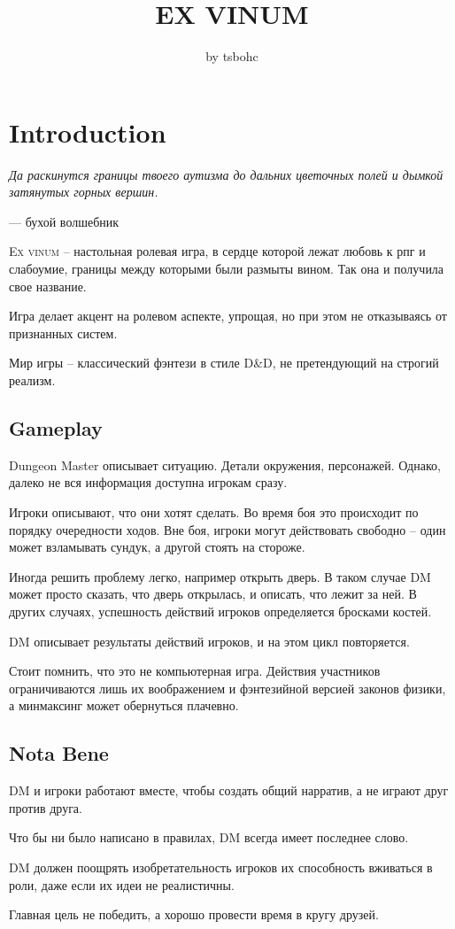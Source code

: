 \documentclass[a5paper,11pt]{book}
\title{\textbf{EX VINUM}}
\author{by tsbohc}
\date{}
\begin{document}
\maketitle
\thispagestyle{empty}
\enlargethispage{\baselineskip}
\tableofcontents
\pagebreak

\chapter{Introduction}
\begin{multicols}{2}
\epigraph{\emph{Да раскинутся границы твоего аутизма до дальних цветочных полей и дымкой затянутых горных вершин.}}{--- бухой волшебник}

\lettrine{E}{x vinum} -- настольная ролевая игра, в сердце которой лежат любовь к рпг и слабоумие, границы между которыми были размыты вином. Так она и получила свое название.

Игра делает акцент на ролевом аспекте, упрощая, но при этом не отказываясь от признанных систем.

Мир игры -- классический фэнтези в стиле D\&D, не претендующий на строгий реализм.

\section{Gameplay}
Dungeon Master описывает ситуацию. Детали окружения, персонажей. Однако, далеко не вся информация доступна игрокам сразу.

Игроки описывают, что они хотят сделать. Во время боя это происходит по порядку очередности ходов. Вне боя, игроки могут действовать свободно -- один может взламывать сундук, а другой стоять на стороже.

Иногда решить проблему легко, например открыть дверь. В таком случае DM может просто сказать, что дверь открылась, и описать, что лежит за ней. В других случаях, успешность действий игроков определяется бросками костей.

DM описывает результаты действий игроков, и на этом цикл повторяется.

Стоит помнить, что это не компьютерная игра. Действия участников ограничиваются лишь их воображением и фэнтезийной версией законов физики, а минмаксинг может обернуться плачевно.

\section{Nota Bene}
DM и игроки работают вместе, чтобы создать общий нарратив, а не играют друг против друга.

Что бы ни было написано в правилах, DM всегда имеет последнее слово.

DM должен поощрять изобретательность игроков их способность вживаться в роли, даже если их идеи не реалистичны.

Главная цель не победить, а хорошо провести время в кругу друзей.

\end{multicols}
\end{document}

